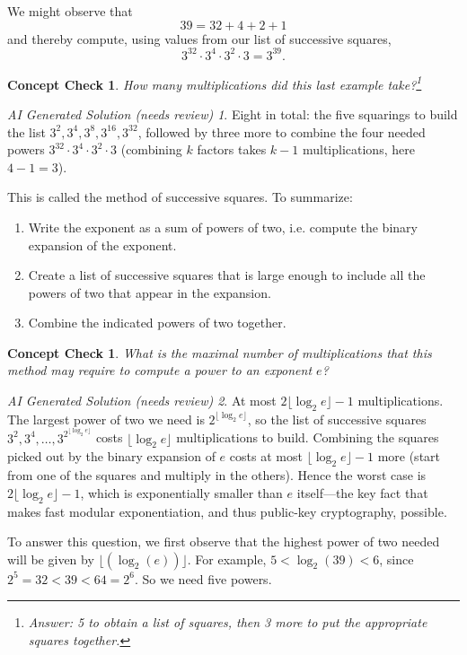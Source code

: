 \documentclass{article}
\theoremstyle{plain}
\newtheorem{checkin}[theorem]{Concept Check}
\theoremstyle{definition}
\theoremstyle{remark}
\newtheorem*{aisolution}{AI Generated Solution (needs review)}
\numberwithin{theorem}{section}
\begin{document}
We might observe that
\[
39 = 32 + 4 + 2 + 1
\]
and thereby compute, using values from our list of successive squares,
\[
3^{32} \cdot 3^{4} \cdot 3^2 \cdot 3 = 3^{39}.
\]

\begin{checkin}
    How many multiplications did this last example take?\footnote{Answer:  5 to obtain a list of squares, then 3 more to put the appropriate squares together.}
\end{checkin}
\begin{aisolution}
Eight in total: the five squarings to build the list $3^2, 3^4, 3^8, 3^{16}, 3^{32}$, followed by three more to combine the four needed powers $3^{32}\cdot 3^4 \cdot 3^2 \cdot 3$ (combining $k$ factors takes $k-1$ multiplications, here $4-1 = 3$).
\end{aisolution}

This is called the method of successive squares.  To summarize:
\begin{enumerate}
    \item Write the exponent as a sum of powers of two, i.e. compute the binary expansion of the exponent.
    \item Create a list of successive squares that is large enough to include all the powers of two that appear in the expansion.
    \item Combine the indicated powers of two together.
\end{enumerate}

\begin{checkin}
    What is the maximal number of multiplications that this method may require to compute a power to an exponent $e$?
\end{checkin}
\begin{aisolution}
At most $2\lfloor \log_2 e\rfloor - 1$ multiplications.  The largest power of two we need is $2^{\lfloor \log_2 e\rfloor}$, so the list of successive squares $3^2, 3^4, \ldots, 3^{2^{\lfloor \log_2 e\rfloor}}$ costs $\lfloor \log_2 e\rfloor$ multiplications to build.  Combining the squares picked out by the binary expansion of $e$ costs at most $\lfloor \log_2 e\rfloor - 1$ more (start from one of the squares and multiply in the others).  Hence the worst case is $2\lfloor \log_2 e\rfloor - 1$, which is exponentially smaller than $e$ itself---the key fact that makes fast modular exponentiation, and thus public-key cryptography, possible.
\end{aisolution}

To answer this question, we first observe that the highest power of two needed will be given by $\lfloor(\log_2(e))\rfloor$.  For example, $5 < \log_2(39) < 6$, since $2^5 = 32 < 39 < 64 = 2^6$.  So we need five powers.
\end{document}
